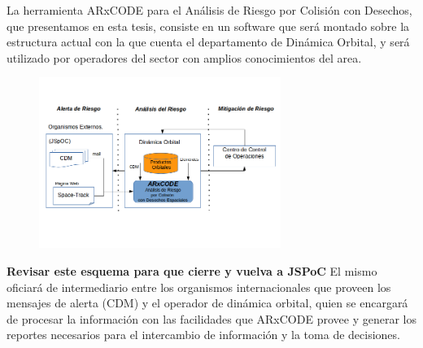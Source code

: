 La herramienta ARxCODE para el An\'alisis de Riesgo por Colisi\'on con Desechos, que presentamos en esta tesis, consiste en un software que ser\'a montado sobre la estructura actual con la que cuenta el departamento de Din\'amica Orbital, y ser\'a utilizado por operadores del sector con amplios conocimientos del area.\\
\begin{figure}[!h]
\centering
  \includegraphics[width=0.7\textwidth]{imagenes/interfasessistemas}
\end{figure}
{\bf{Revisar este esquema para que cierre y vuelva a JSPoC}}
El mismo oficiar\'a de intermediario entre los organismos internacionales que proveen los mensajes de alerta (CDM) y el operador de din\'amica orbital, quien se encargar\'a de procesar la informaci\'on con las facilidades que ARxCODE provee y generar los reportes necesarios para el intercambio de informaci\'on y la toma de decisiones.\\ 

